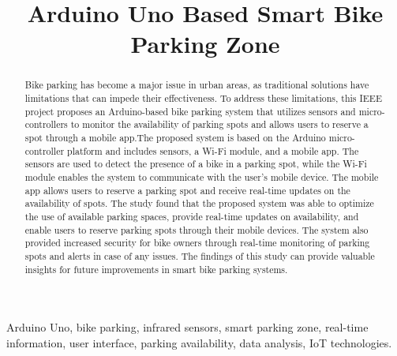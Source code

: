 \documentclass[conference]{IEEEtran}
\begin{document}
	
	\title{Arduino Uno Based Smart Bike Parking Zone\\
		

	}
	
	\author{ 
		\and
	}
	
	\maketitle
	
	\begin{abstract}
	Bike parking has become a major issue in urban areas, as traditional solutions have limitations that can impede their effectiveness. To address these limitations, this IEEE project proposes an Arduino-based bike parking system that utilizes sensors and micro-controllers to monitor the availability of parking spots and allows users to reserve a spot through a mobile app.The proposed system is based on the Arduino micro-controller platform and includes sensors, a Wi-Fi module, and a mobile app. The sensors are used to detect the presence of a bike in a parking spot, while the Wi-Fi module enables the system to communicate with the user's mobile device. The mobile app allows users to reserve a parking spot and receive real-time updates on the availability of spots.	The study found that the proposed system was able to optimize the use of available parking spaces, provide real-time updates on availability, and enable users to reserve parking spots through their mobile devices. The system also provided increased security for bike owners through real-time monitoring of parking spots and alerts in case of any issues. The findings of this study can provide valuable insights for future improvements in smart bike parking systems.
	\end{abstract}
	
	\begin{IEEEkeywords}
		Arduino Uno, bike parking, infrared sensors, smart parking zone, real-time information, user interface, parking availability, data analysis, IoT technologies.
	\end{IEEEkeywords}
	
\end{document}
